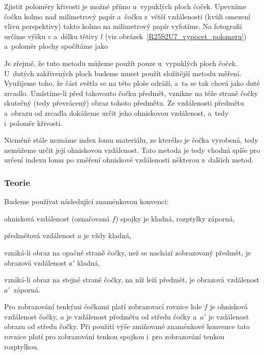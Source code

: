 {\ifyearbook%
%
\else%
%
\fi

Zjistit poloměry křivosti je možné přímo u~vypuklých ploch čoček. Upevníme čočku
kolmo nad milimetrový papír a~čočku z~větší vzdálenosti (kvůli omezení vlivu
perspektivy) takto kolmo na milimetrový papír vyfotíme. Na fotografii 
určíme výšku $ v $ a~délku tětivy $ l $
(viz obrázek~\ref{R25S2U7_vypocet_polomeru}) a~poloměr plochy spočítáme jako 

Je zřejmé, že tuto metodu můžeme použít pouze u~vypuklých ploch čoček. U~dutých
zakřivených ploch budeme muset použít složitější metodu měření. Využijeme toho,
že část světla se na této ploše odráží, a~ta se tak chová jako duté zrcadlo.
Umístíme-li před takovouto čočku předmět, vznikne na téže straně čočky skutečný
(tedy převrácený) obraz tohoto předmětu. Ze vzdálenosti předmětu a~obrazu od
zrcadla dokážeme určit jeho ohniskovou vzdálenost, a~tedy i~poloměr křivosti.

Nicméně stále neznáme index lomu materiálu, ze kterého je čočka vyrobená, tedy
nemůžeme určit její ohniskovou vzdálenost. Tato metoda je tedy vhodná spíše pro
určení indexu lomu po změření ohniskové vzdálenosti některou z~dalších metod.

\subsubsection{Teorie}

Budeme používat následující znaménkovou konvenci:
\begin{compactitem}
    \item ohnisková vzdálenost (označovaná $ f $) spojky je kladná, rozptylky záporná,
    \item předmětová vzdálenost $ a $ je vždy kladná,
    \item vzniká-li obraz na opačné straně čočky, než se nachází zobrazovaný předmět, je obrazová vzdálenost $ a' $ kladná,
    \item vzniká-li obraz na stejné straně čočky, na níž leží předmět, je obrazová vzdálenost $ a' $~záporná.
\end{compactitem}

Pro zobrazování tenkými čočkami platí zobrazovací rovnice
kde $ f $ je ohnisková vzdálenost čočky, $ a $ je vzdálenost předmětu
od středu čočky a~$ a' $ je vzdálenost obrazu od středu čočky. Při použití výše
zmiňované znaménkové konvence tato rovnice platí pro zobrazování tenkou spojkou
i~pro zobrazování tenkou rozptylkou.

}
